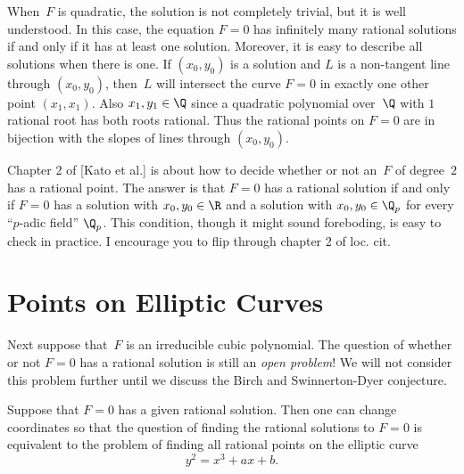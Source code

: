 \documentclass[11pt]{report}
\begin{document}
When~$F$ is quadratic, the solution is not completely trivial, but it
is well understood.  In this case, the equation $F=0$ has infinitely
many rational solutions if and only if it has at least one solution.
Moreover, it is easy to describe all solutions when there is one.  If
$(x_0, y_0)$ is a solution and $L$ is a non-tangent line through
$(x_0,y_0)$, then~$L$ will intersect the curve $F=0$ in exactly one
other point $(x_1, x_1)$.  Also $x_1, y_1\in\Q$ since a quadratic
polynomial over~$\Q$ with $1$ rational root has both roots rational.
Thus the rational points on $F=0$ are in bijection with the slopes of
lines through $(x_0,y_0)$.

Chapter 2 of [Kato et al.] is about how to decide whether
or not an~$F$ of degree~$2$ has a rational point.  The answer is that
$F=0$ has a rational solution if and only if $F=0$ has a solution with
$x_0,y_0\in\R$ and a solution with $x_0,y_0\in\Q_p$ for every
``$p$-adic field'' $\Q_p$.   This condition, though it might sound
foreboding, is easy to check in practice.   I encourage you to
flip through chapter 2 of loc. cit.

\section{Points on Elliptic Curves}
Next suppose that~$F$ is an irreducible cubic polynomial.
The question of whether or not $F=0$ has a rational solution is
still an {\em open problem}!  We will not consider this problem
further until we discuss the Birch and Swinnerton-Dyer conjecture.

Suppose that $F=0$ has a given rational solution.  Then one can change
coordinates so that the question of finding the rational solutions to
$F=0$ is equivalent to the problem of finding all rational points on
the elliptic curve
$$
  y^2 = x^3 + ax + b.
$$
\end{document}
